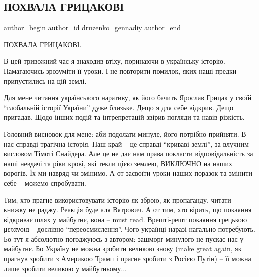  
 
 
 
 
 
\subsection{ПОХВАЛА ГРИЦАКОВІ}
\label{sec:18_02_2022.fb.druzenko_gennadiy.1.pohvala_grycakovi}
 
\ifcmt
 author_begin
   author_id druzenko_gennadiy
 author_end
\fi

ПОХВАЛА ГРИЦАКОВІ.

В цей тривожний час я знаходив втіху, поринаючи в українську історію.
Намагаючись зрозуміти її уроки. І не повторити помилок, яких наші предки
припустились на цій землі.


Для мене читання українського наративу, як його бачить Ярослав Грицак у своїй
\enquote{глобальній історії України} дуже близьке. Дещо я для себе відкрив. Дещо
пригадав. Щодо інших подій та інтрепретацій звірив погляди та навів різкість.

Головний висновок для мене: аби подолати минуле, його потрібно прийняти. В нас
справді трагічна історія. Наш край – це справді \enquote{криваві землі}, за влучним
висловом Тімоті Снайдера. Але це не дає нам права покласти відповідальність за
наші невдачі та ріки крові, які текли цією землею, ВИКЛЮЧНО на наших ворогів.
Їх ми навряд чи змінимо. А от засвоїти уроки наших поразок та змінити себе –
можемо спробувати.

Тим, хто прагне використовувати історію як зброю, як пропаганду, читати книжку
не раджу. Реакція буде аля Вятрович. А от тим, хто вірить, що покаяння
відкриває шлях у майбутнє, вона – must read. Врешті-решт покаяння грецькою
μετάνοια – дослівно \enquote{переосмислення}. Чого українці наразі нагально
потребують.  Бо тут я абсолютно погоджуюсь з автором: зашморг минулого не
пускає нас у майбутнє. Бо Україну не можна зробити великою знову (make great
again, як прагнув зробити з Америкою Трамп і прагне зробити з Росією Путін) –
її можна лише зробити великою у майбутньому...

